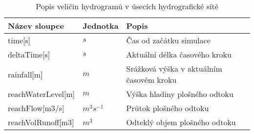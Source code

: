 


\begin{table}[t]
 

 \centering
 \caption{Popis veličin  hydrogramů v úsecích hydrografické sítě}
\label{tab:vystupytokdat}

 \begin{tabular}{llp{}}
  \hline  \hline
 Název sloupce        & Jednotka     & Popis                                      \\ 
 \hline
 time[s]              &   $s$              &  Čas od začátku simulace                   \\
 deltaTime[s]         &   $s$              &  Aktuální délka časového kroku            \\
 rainfall[m]          &  $m$               &  Srážková výška v aktuálním časovém kroku \\
 reachWaterLevel[m]        &  $m$          &  Výška hladiny plošného odtoku            \\
 reachFlow[m3/s]              &  $m^3s^{-1}$   &  Průtok plošného odtoku                   \\
 reachVolRunoff[m3]           &  $m^3$         & Odteklý objem plošného odtoku     \\
  \hline
 \end{tabular}

\end{table}

% 
% 
